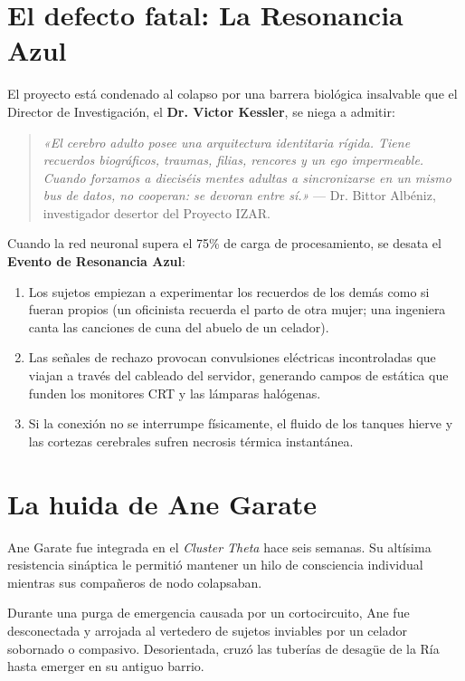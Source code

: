 \section{El defecto fatal: La Resonancia Azul}

El proyecto está condenado al colapso por una barrera biológica insalvable que el Director de Investigación, el \textbf{Dr. Victor Kessler}, se niega a admitir:

\begin{quote}
\textit{«El cerebro adulto posee una arquitectura identitaria rígida. Tiene recuerdos biográficos, traumas, filias, rencores y un ego impermeable. Cuando forzamos a dieciséis mentes adultas a sincronizarse en un mismo bus de datos, no cooperan: se devoran entre sí.»}
\flushright --- Dr. Bittor Albéniz, investigador desertor del Proyecto IZAR.
\end{quote}

Cuando la red neuronal supera el 75\% de carga de procesamiento, se desata el \textbf{Evento de Resonancia Azul}:
\begin{enumerate}
  \item {} Los sujetos empiezan a experimentar los recuerdos de los demás como si fueran propios (un oficinista recuerda el parto de otra mujer; una ingeniera canta las canciones de cuna del abuelo de un celador).
  \item {} Las señales de rechazo provocan convulsiones eléctricas incontroladas que viajan a través del cableado del servidor, generando campos de estática que funden los monitores CRT y las lámparas halógenas.
  \item {} Si la conexión no se interrumpe físicamente, el fluido de los tanques hierve y las cortezas cerebrales sufren necrosis térmica instantánea.
\end{enumerate}

\section{La huida de Ane Garate}

Ane Garate fue integrada en el \emph{Cluster Theta} hace seis semanas. Su altísima resistencia sináptica le permitió mantener un hilo de consciencia individual mientras sus compañeros de nodo colapsaban. 

Durante una purga de emergencia causada por un cortocircuito, Ane fue desconectada y arrojada al vertedero de sujetos inviables por un celador sobornado o compasivo. Desorientada, cruzó las tuberías de desagüe de la Ría hasta emerger en su antiguo barrio. 

